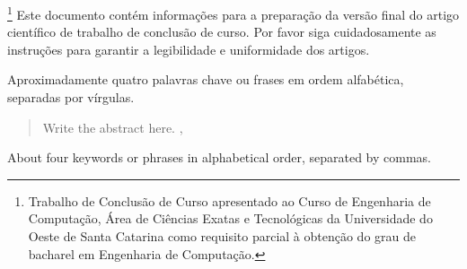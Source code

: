  \vspace{0.3cm}
  \begin{resumo}
    \noindent\footnote{Trabalho de Conclusão de Curso apresentado ao Curso de Engenharia de Computação, Área de Ciências Exatas e Tecnológicas da Universidade do Oeste de Santa Catarina como requisito parcial à obtenção do grau de bacharel em Engenharia de Computação.}
     Este documento contém informações para a preparação da versão final do artigo científico de trabalho de conclusão de curso. Por favor siga cuidadosamente as instruções para garantir a legibilidade e uniformidade dos artigos.
    \lipsum[1-1]
    
  \end{resumo}
  
  \begin{palavraschave}
    
    Aproximadamente quatro palavras chave ou frases em ordem alfabética, separadas por vírgulas.
  \end{palavraschave}
  
  \vspace{0.5cm}
  
  \begin{abstract}
  \noindent Write the abstract here. ,
    \lipsum[1-1]
  \end{abstract}

  \begin{IEEEkeywords}
    About four keywords or phrases in alphabetical order, separated by commas.
  \end{IEEEkeywords}
  
    \vspace{0.5cm}